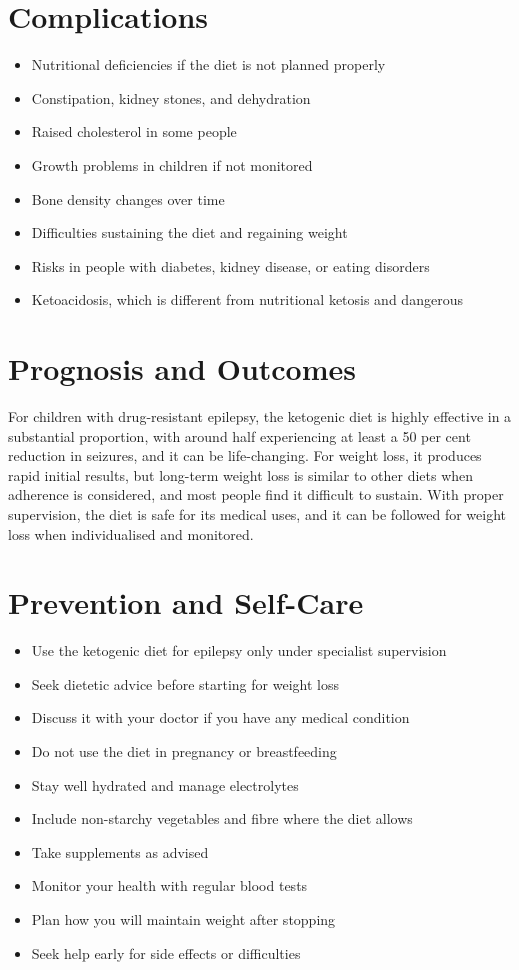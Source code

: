 \section*{Complications}
\begin{itemize}
    \item Nutritional deficiencies if the diet is not planned properly
    \item Constipation, kidney stones, and dehydration
    \item Raised cholesterol in some people
    \item Growth problems in children if not monitored
    \item Bone density changes over time
    \item Difficulties sustaining the diet and regaining weight
    \item Risks in people with diabetes, kidney disease, or eating disorders
    \item Ketoacidosis, which is different from nutritional ketosis and dangerous
\end{itemize}

\section*{Prognosis and Outcomes}
For children with drug-resistant epilepsy, the ketogenic diet is highly effective in a substantial proportion, with around half experiencing at least a 50 per cent reduction in seizures, and it can be life-changing. For weight loss, it produces rapid initial results, but long-term weight loss is similar to other diets when adherence is considered, and most people find it difficult to sustain. With proper supervision, the diet is safe for its medical uses, and it can be followed for weight loss when individualised and monitored.

\section*{Prevention and Self-Care}
\begin{itemize}
    \item Use the ketogenic diet for epilepsy only under specialist supervision
    \item Seek dietetic advice before starting for weight loss
    \item Discuss it with your doctor if you have any medical condition
    \item Do not use the diet in pregnancy or breastfeeding
    \item Stay well hydrated and manage electrolytes
    \item Include non-starchy vegetables and fibre where the diet allows
    \item Take supplements as advised
    \item Monitor your health with regular blood tests
    \item Plan how you will maintain weight after stopping
    \item Seek help early for side effects or difficulties
\end{itemize}

